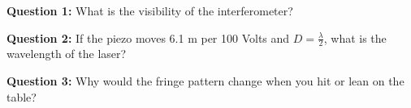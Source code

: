\textbf{Question 1:}
	\indent What is the visibility of the interferometer?
	
\textbf{Question 2:}
    \indent If the piezo moves 6.1 \mu m per 100 Volts and
    $D=\frac{\lambda}{2}$, what is the wavelength of the laser?
	
\textbf{Question 3:}
    \indent Why would the fringe pattern change when you hit or lean on the
    table?

